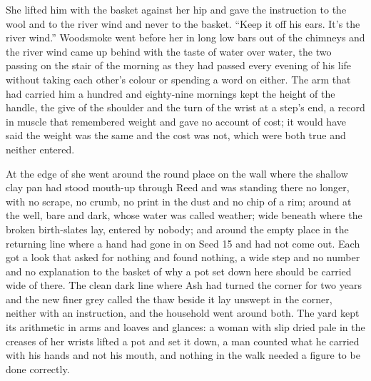 She lifted him with the basket against her hip and gave the instruction to the wool and to the river wind and never to the basket. “Keep it off his ears. It's the river wind.” Woodsmoke went before her in long low bars out of the chimneys and the river wind came up behind with the taste of water over water, the two passing on the stair of the morning as they had passed every evening of his life without taking each other's colour or spending a word on either. The arm that had carried him a hundred and eighty-nine mornings kept the height of the handle, the give of the shoulder and the turn of the wrist at a step's end, a record in muscle that remembered weight and gave no account of cost; it would have said the weight was the same and the cost was not, which were both true and neither entered.

At the edge of  she went around the round place on the wall where the shallow clay pan had stood mouth-up through Reed and was standing there no longer, with no scrape, no crumb, no print in the dust and no chip of a rim; around  at the well, bare and dark, whose water was called weather; wide beneath  where the broken birth-slates lay, entered by nobody; and around the empty place in the returning line where a hand had gone in on Seed 15 and had not come out. Each got a look that asked for nothing and found nothing, a wide step and no number and no explanation to the basket of why a pot set down here should be carried wide of there. The clean dark line where Ash had turned the corner for two years and the new finer grey called the thaw beside it lay unswept in the corner, neither with an instruction, and the household went around both. The yard kept its arithmetic in arms and loaves and glances: a woman with slip dried pale in the creases of her wrists lifted a pot and set it down, a man counted what he carried with his hands and not his mouth, and nothing in the walk needed a figure to be done correctly.

